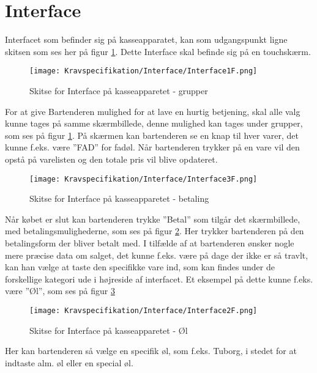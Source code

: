 \section{Interface}
Interfacet som befinder sig på kasseapparatet, kan som udgangspunkt ligne skitsen som ses her på figur \ref{fig:Interface1}. Dette Interface skal befinde sig på en touchskærm.

\begin{figure}[ht]
	\centering
	\texttt{[image: Kravspecifikation/Interface/Interface1F.png]}
	\caption{Skitse for Interface på kasseapparetet - grupper}
	\label{fig:Interface1}
\end{figure}

For at give Bartenderen mulighed for at lave en hurtig betjening, skal alle valg kunne tages på samme skærmbillede, denne mulighed kan tages under grupper, som ses på figur \ref{fig:Interface1}. 
\newline\newline
På skærmen kan bartenderen se en knap til hver varer, det kunne f.eks. være ''FAD'' for fadøl. Når bartenderen trykker på en vare vil den opstå på varelisten og den totale pris vil blive opdateret. 

\begin{figure}[H]
	\centering
	\texttt{[image: Kravspecifikation/Interface/Interface3F.png]}
	\caption{Skitse for Interface på kasseapparetet - betaling}
	\label{fig:Interface3}
\end{figure}
Når købet er slut kan bartenderen trykke ''Betal'' som tilgår det skærmbillede, med betalingsmulighederne, som ses på figur \ref{fig:Interface3}. Her trykker bartenderen på den betalingsform der bliver betalt med. 
\newpage
I tilfælde af at bartenderen ønsker nogle mere præcise data om salget, det kunne f.eks. være på dage der ikke er så travlt, kan han vælge at taste den specifikke vare ind, som kan findes under de forskellige kategori ude i højreside af interfacet. Et eksempel på dette kunne f.eks. være ''Øl'', som ses på figur \ref{fig:Interface2}

\begin{figure}[ht]
	\centering
	\texttt{[image: Kravspecifikation/Interface/Interface2F.png]}
	\caption{Skitse for Interface på kasseapparetet - Øl}
	\label{fig:Interface2}
\end{figure}

Her kan bartenderen så vælge en specifik øl, som f.eks. Tuborg, i stedet for at indtaste alm. øl eller en special øl.

